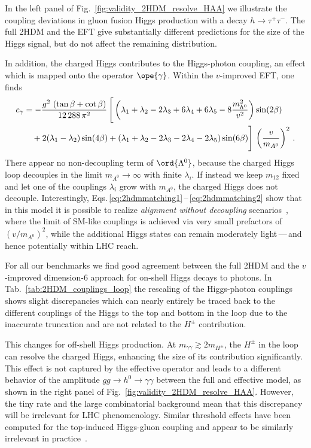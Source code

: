 In the left panel of Fig.~\ref{fig:validity_2HDM_resolve_HAA} we illustrate the
coupling deviations in gluon fusion Higgs production with a decay
$h\to \tau^+ \tau^-$. The full 2HDM and the EFT give substantially
different predictions for the size of the Higgs signal, but do not
affect the remaining distribution.\medskip

In addition, the charged Higgs contributes to the Higgs-photon
coupling, an effect which is mapped onto the operator
$\ope{\gamma}$. Within the $v$-improved EFT, one finds
%
\begin{align} c_\gamma &= - \frac {g^2 \, \left(\tan \beta + \cot
\beta \right) } {12\,288 \, \pi^2} \, \Bigg[\left(\lambda_1 +
\lambda_2 - 2 \lambda_3 + 6 \lambda_4 + 6 \lambda_5 - 8 \frac
{m_{h^0}^2} {v^2} \right) \sin (2 \beta) \notag \\ &\quad + 2 (
\lambda_1 - \lambda_2) \sin (4 \beta) + (\lambda_1 + \lambda_2- 2
\lambda_3 - 2 \lambda_4 - 2 \lambda_5 ) \sin (6 \beta) \Bigg] \,
\left(\frac {v}{m_{A^0}}\right)^2 \,.
              \label{eq:2hdmmatching2}
\end{align}
%
There appear no non-decoupling term of $\ord{\Lambda^0}$, because the
charged Higgs loop decouples in the limit $m_{A^0} \to \infty$ with
finite $\lambda_i$. If instead we keep $m_{12}$ fixed and let one of
the couplings $\lambda_i$ grow with $m_{A^0}$, the charged Higgs does
not decouple.  Interestingly,
Eqs.\,\eqref{eq:2hdmmatching1}\,--\,\eqref{eq:2hdmmatching2} show that
in this model it is possible to realize \emph{alignment without
decoupling}
scenarios~\cite{Gunion:2002zf,Craig:2013hca,Carena:2013ooa,Delgado:2013zfa},
where the limit of SM-like couplings is achieved via very small
prefactors of $(v/m_{A^0})^2$, while the additional Higgs states can
remain moderately light\,---\,and hence potentially within LHC reach.

For all our benchmarks we find good agreement between the full 2HDM
and the $v$-improved dimension-6 approach for on-shell Higgs decays to
photons.  In Tab.~\ref{tab:2HDM_couplings_loop} the rescaling of the
Higgs-photon couplings shows slight discrepancies which can nearly
entirely be traced back to the different couplings of the Higgs to the
top and bottom in the loop due to the inaccurate truncation and are
not related to the $H^\pm$ contribution.

This changes for off-shell Higgs production. At $m_{\gamma \gamma}
\gtrsim 2 m_{H^\pm}$, the $H^\pm$ in the loop can resolve the charged
Higgs, enhancing the size of its contribution significantly. This
effect is not captured by the effective operator and leads to a
different behavior of the amplitude $g g \to h^0 \to \gamma \gamma$
between the full and effective model, as shown in the right panel of
Fig.~\ref{fig:validity_2HDM_resolve_HAA}. However, the tiny rate and the large
combinatorial background mean that this discrepancy will be irrelevant
for LHC phenomenology. Similar threshold effects have been computed
for the top-induced Higgs-gluon coupling and appear to be similarly
irrelevant in practice~\cite{Buschmann:2014twa}.\medskip

